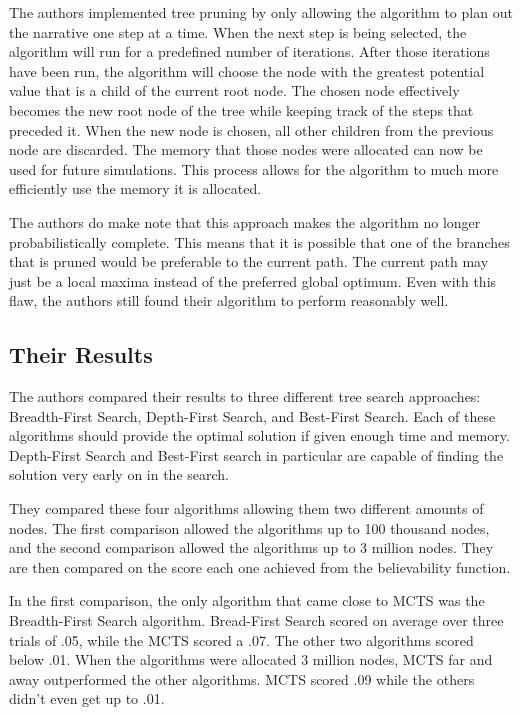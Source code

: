 \documentclass{sig-alternate}
\begin{document}
The authors implemented tree pruning by only allowing the algorithm to plan out the narrative one step at a time. When the next step is being selected, the algorithm will run for a predefined number of iterations. After those iterations have been run, the algorithm will choose the node with the greatest potential value that is a child of the current root node. The chosen node effectively becomes the new root node of the tree while keeping track of the steps that preceded it. When the new node is chosen, all other children from the previous node are discarded. The memory that those nodes were allocated can now be used for future simulations. This process allows for the algorithm to much more efficiently use the memory it is allocated.

The authors do make note that this approach makes the algorithm no longer probabilistically complete. This means that it is possible that one of the branches that is pruned would be preferable to the current path. The current path may just be a local maxima instead of the preferred global optimum. Even with this flaw, the authors still found their algorithm to perform reasonably well. 

\subsection{Their Results}
The authors compared their results to three different tree search approaches: Breadth-First Search, Depth-First Search, and Best-First Search\cite{Narrative}. Each of these algorithms should provide the optimal solution if given enough time and memory. Depth-First Search and Best-First search in particular are capable of finding the solution very early on in the search.

They compared these four algorithms allowing them two different amounts of nodes. The first comparison allowed the algorithms up to 100 thousand nodes, and the second comparison allowed the algorithms up to 3 million nodes. They are then compared on the score each one achieved from the believability function.

In the first comparison, the only algorithm that came close to MCTS was the Breadth-First Search algorithm. Bread-First Search scored on average over three trials of .05, while the MCTS scored a .07. The other two algorithms scored below .01. When the algorithms were allocated 3 million nodes, MCTS far and away outperformed the other algorithms. MCTS scored .09 while the others didn't even get up to .01.
\end{document}
